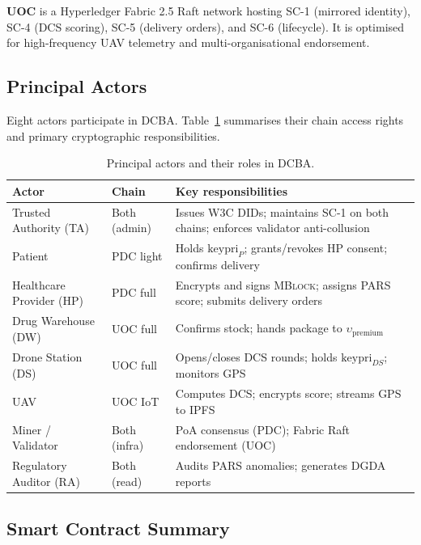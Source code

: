 \documentclass[sigplan,screen]{acmart}
\newcommand{\dcba}{\textsc{DCBA}\xspace}
\newcommand{\uoc}{UOC\xspace}
\newcommand{\pars}{\textsc{PARS}\xspace}
\newcommand{\mblock}{\textsc{MBlock}\xspace}
\begin{document}
\noindent
\textbf{\uoc} is a Hyperledger Fabric 2.5 Raft network hosting SC-1 (mirrored
identity), SC-4 (DCS scoring), SC-5 (delivery orders), and SC-6 (lifecycle).
It is optimised for high-frequency UAV telemetry and multi-organisational
endorsement.

\subsection{Principal Actors}

Eight actors participate in \dcba. Table~\ref{tab:actors} summarises their
chain access rights and primary cryptographic responsibilities.

\begin{table}[t]
\caption{Principal actors and their roles in \dcba.}
\label{tab:actors}
\small
\begin{tabular}{@{}p{1.5cm}p{1.2cm}p{3.5cm}@{}}
\toprule
\textbf{Actor} & \textbf{Chain} & \textbf{Key responsibilities} \\
\midrule
Trusted Authority (TA)
  & Both (admin) & Issues W3C DIDs; maintains SC-1 on both chains;
    enforces validator anti-collusion \\[2pt]
Patient
  & PDC light & Holds $\text{keypri}_P$; grants/revokes HP consent;
    confirms delivery \\[2pt]
Healthcare Provider (HP)
  & PDC full & Encrypts and signs \mblock; assigns \pars score;
    submits delivery orders \\[2pt]
Drug Warehouse (DW)
  & UOC full & Confirms stock; hands package to $\upsilon_{\text{premium}}$ \\[2pt]
Drone Station (DS)
  & UOC full & Opens/closes DCS rounds; holds $\text{keypri}_{DS}$;
    monitors GPS \\[2pt]
UAV
  & UOC IoT & Computes DCS; encrypts score; streams GPS to IPFS \\[2pt]
Miner / Validator
  & Both (infra) & PoA consensus (PDC); Fabric Raft endorsement (UOC) \\[2pt]
Regulatory Auditor (RA)
  & Both (read) & Audits \pars anomalies; generates DGDA reports \\
\bottomrule
\end{tabular}
\end{table}

\subsection{Smart Contract Summary}
\end{document}

